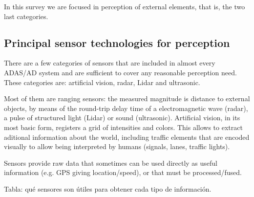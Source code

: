 In this survey we are focused in perception of external elements, that is, the
two last categories.

\subsection{Principal sensor technologies for perception}

There are a few categories of sensors that are included in almost every ADAS/AD
system and are sufficient to cover any reasonable perception need. 
These categories are: artificial vision, radar, Lidar and 
ultrasonic.

Most of them are ranging sensors: the measured magnitude is distance to 
external objects, by means of the round-trip delay time of a electromagnetic 
wave (radar), a pulse of structured light (Lidar) or sound (ultrasonic).
Artificial vision, in its most basic form, registers a grid of intensities and 
colors. This allows to extract aditional information about the world, including 
traffic elements that are encoded visually to allow being interpreted by humans 
(signals, lanes, traffic lights).

Sensors provide raw data that sometimes can be used directly as useful
information (e.g. GPS giving location/speed), or that must be processed/fused.

Tabla: qué sensores son útiles para obtener cada tipo de información.

